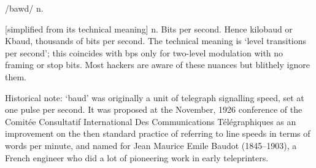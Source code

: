  /bawd/ n.

[simplified from its technical meaning] n. Bits per second. Hence kilobaud or
Kbaud, thousands of bits per second. The technical meaning is `level transitions
per second'; this coincides with bps only for two-level modulation with no
framing or stop bits. Most hackers are aware of these nuances but blithely
ignore them.

Historical note: `baud' was originally a unit of telegraph signalling speed, set
at one pulse per second. It was proposed at the November, 1926 conference of the
Comit\'{e}e Consultatif International Des Communications T\'{e}l\'{e}graphiques
as an improvement on the then standard practice of referring to line speeds in
terms of words per minute, and named for Jean Maurice Emile Baudot (1845--1903),
a French engineer who did a lot of pioneering work in early teleprinters.


